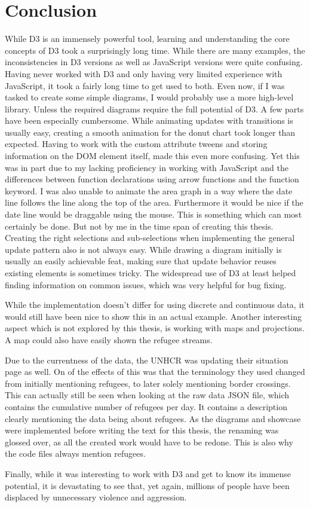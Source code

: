 \chapter{Conclusion}\label{sec:conclusion}

While D3 is an immensely powerful tool, learning and understanding the core concepts of D3 took a surprisingly long time. While there are many examples, the inconsistencies in D3 versions as well as JavaScript versions were quite confusing. Having never worked with D3 and only having very limited experience with JavaScript, it took a fairly long time to get used to both.
Even now, if I was tasked to create some simple diagrams, I would probably use a more high-level library. Unless the required diagrams require the full potential of D3.
A few parts have been especially cumbersome. While animating updates with transitions is usually easy, creating a smooth animation for the donut chart took longer than expected. Having to work with the custom attribute tweens and storing information on the DOM element itself, made this even more confusing. Yet this was in part due to my lacking proficiency in working with JavaScript and the differences between function declarations using arrow functions and the function keyword. I was also unable to animate the area graph in a way where the date line follows the line along the top of the area. Furthermore it would be nice if the date line would be draggable using the mouse. This is something which can most certainly be done. But not by me in the time span of creating this thesis. Creating the right selections and sub-selections when implementing the general update pattern also is not always easy. While drawing a diagram initially is usually an easily achievable feat, making sure that update behavior reuses existing elements is sometimes tricky. The widespread use of D3 at least helped finding information on common issues, which was very helpful for bug fixing.

While the implementation doesn't differ for using discrete and continuous data, it would still have been nice to show this in an actual example. Another interesting aspect which is not explored by this thesis, is working with maps and projections. A map could also have easily shown the refugee streams.

Due to the currentness of the data, the UNHCR was updating their situation page as well. On of the effects of this was that the terminology they used changed from initially mentioning refugees, to later solely mentioning border crossings. This can actually still be seen when looking at the raw data JSON file, which contains the cumulative number of refugees per day. It contains a description clearly mentioning the data being about refugees. As the diagrams and showcase were implemented before writing the text for this thesis, the renaming was glossed over, as all the created work would have to be redone. This is also why the code files always mention refugees. 

Finally, while it was interesting to work with D3 and get to know its immense potential, it is devastating to see that, yet again, millions of people have been displaced by unnecessary violence and aggression.
